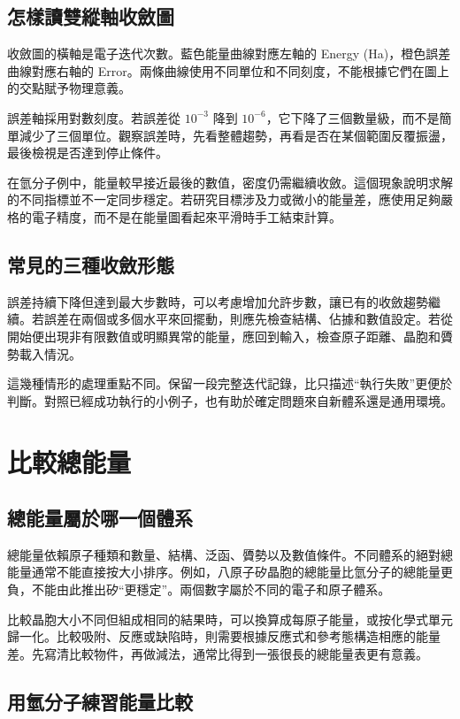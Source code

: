 \subsection{怎樣讀雙縱軸收斂圖}

收斂圖的橫軸是電子迭代次數。藍色能量曲線對應左軸的 Energy (Ha)，橙色誤差曲線對應右軸的 Error。兩條曲線使用不同單位和不同刻度，不能根據它們在圖上的交點賦予物理意義。

誤差軸採用對數刻度。若誤差從 $10^{-3}$ 降到 $10^{-6}$，它下降了三個數量級，而不是簡單減少了三個單位。觀察誤差時，先看整體趨勢，再看是否在某個範圍反覆振盪，最後檢視是否達到停止條件。

在氫分子例中，能量較早接近最後的數值，密度仍需繼續收斂。這個現象說明求解的不同指標並不一定同步穩定。若研究目標涉及力或微小的能量差，應使用足夠嚴格的電子精度，而不是在能量圖看起來平滑時手工結束計算。

\subsection{常見的三種收斂形態}

誤差持續下降但達到最大步數時，可以考慮增加允許步數，讓已有的收斂趨勢繼續。若誤差在兩個或多個水平來回擺動，則應先檢查結構、佔據和數值設定。若從開始便出現非有限數值或明顯異常的能量，應回到輸入，檢查原子距離、晶胞和贗勢載入情況。

這幾種情形的處理重點不同。保留一段完整迭代記錄，比只描述“執行失敗”更便於判斷。對照已經成功執行的小例子，也有助於確定問題來自新體系還是通用環境。

\section{比較總能量}

\subsection{總能量屬於哪一個體系}

總能量依賴原子種類和數量、結構、泛函、贗勢以及數值條件。不同體系的絕對總能量通常不能直接按大小排序。例如，八原子矽晶胞的總能量比氫分子的總能量更負，不能由此推出矽“更穩定”。兩個數字屬於不同的電子和原子體系。

比較晶胞大小不同但組成相同的結果時，可以換算成每原子能量，或按化學式單元歸一化。比較吸附、反應或缺陷時，則需要根據反應式和參考態構造相應的能量差。先寫清比較物件，再做減法，通常比得到一張很長的總能量表更有意義。

\subsection{用氫分子練習能量比較}

